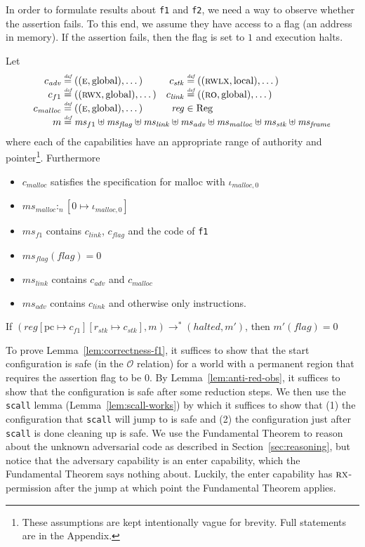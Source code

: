\documentclass[format=acmsmall, review=true, screen=true]{acmart}
\renewcommand{\sectionname}{Section}
\newcommand{\update}[2]{[#1 \mapsto #2]}
\newcommand{\defeq}{\stackrel{\textit{\tiny{def}}}{=}}
\newcommand{\var}[1]{\mathit{#1}}
\newcommand{\hs}{\var{ms}}
\newcommand{\ms}{\hs}
\newcommand{\pcreg}{\mathrm{pc}}
\newcommand{\reg}{\var{reg}}
\newcommand{\heap}{\var{mem}}
\newcommand{\adv}{\var{adv}}
\newcommand{\link}{\var{link}}
\newcommand{\stk}{\var{stk}}
\newcommand{\flag}{\var{flag}}
\newcommand{\halted}{\mathit{halted}}
\newcommand{\heapSat}[3][\heap]{#1 :_{#2} #3}
\newcommand{\codelabel}[1]{\mathit{#1}}
\newcommand{\malloc}{\codelabel{malloc}}
\newcommand{\plaindom}[1]{\mathrm{#1}}
\newcommand{\Regs}{\plaindom{Reg}}
\newcommand{\observations}{\mathcal{O}}
\newcommand{\plainperm}[1]{\textsc{#1}}
\newcommand{\readonly}{\plainperm{ro}}
\newcommand{\exec}{\plainperm{rx}}
\newcommand{\entry}{\plainperm{e}}
\newcommand{\rwx}{\plainperm{rwx}}
\newcommand{\rwlx}{\plainperm{rwlx}}
\newcommand{\plainlocality}[1]{\mathrm{#1}}
\newcommand{\local}{\plainlocality{local}}
\newcommand{\glob}{\plainlocality{global}}
\newcommand{\step}[1][]{\rightarrow_{#1}}
\begin{document}
In order to formulate results about \texttt{f1} and
\texttt{f2}, we need a way to observe whether the assertion
fails. To this end, we assume they have access to a flag (an address in memory).
If the assertion fails, then the flag is set to $1$ and execution halts. 
\begin{lemma}
  \label{lem:correctness-f1}
  Let
\[
    \begin{array}{r@{}lr@{}l}
    c_\adv & \;\defeq ((\entry,\glob),\dots) & c_{\var{stk}} & \;\defeq ((\rwlx,\local),\dots)\\
    c_{f1} & \;\defeq ((\rwx,\glob),\dots) & c_\link &\; \defeq ((\readonly,\glob),\dots)\\
    c_\malloc &\; \defeq ((\entry,\glob),\dots) & \reg& \; \in \Regs \\
    m &  \multicolumn{3}{@{}l}{\;\defeq \ms_{f1} \uplus \ms_\flag \uplus \ms_{\var{link}} \uplus \hs_\adv \uplus \ms_{\malloc} \uplus \ms_{\var{stk}} \uplus \ms_{\var{frame}}} \\
    \end{array}
\]
where each of the capabilities have an appropriate range of authority and
pointer\footnote{These assumptions are kept intentionally vague for brevity.
  Full statements are in the Appendix.}.
Furthermore
  \begin{itemize}
  \item $c_\malloc$ satisfies the specification for malloc with
    $\iota_{\malloc,0}$
  \item $\heapSat[\hs_{\malloc}]{n}{[0 \mapsto \iota_{\malloc,0}]}$
  \item $\ms_{f1}$ contains $c_\link$, $c_\flag$ and the code of \texttt{f1}
  \item $\ms_\flag(\flag) = 0$
  \item $\ms_{\var{link}}$ contains $c_\adv$ and $c_\malloc$
  \item $\hs_\adv$ contains $c_\link$ and otherwise only instructions.
  \end{itemize}
  If $(\reg\update{\pcreg}{c_{f1}}\update{r_\stk}{c_\stk},m) \step^* (\halted,m')$,
  then $m'(\flag) = 0$
\end{lemma}

To prove Lemma~\ref{lem:correctness-f1}, it suffices to show that the start configuration is safe (in the $\observations$ relation) for a world with a permanent region that requires the assertion flag to be 0.
By Lemma~\ref{lem:anti-red-obs}, it suffices to show that the configuration is safe after some reduction steps.
We then use the \texttt{scall} lemma (Lemma~\ref{lem:scall-works}) by which it suffices to show that (1) the configuration that \texttt{scall} will jump to is safe and (2) the configuration just after \texttt{scall} is done cleaning up is safe.
We use the Fundamental Theorem to reason about the unknown adversarial code as described in \sectionname~\ref{sec:reasoning}, but notice that the adversary capability is an enter capability, which the Fundamental Theorem says nothing about.
Luckily, the enter capability has $\exec$-permission after the jump at which point the Fundamental Theorem applies.
\end{document}

